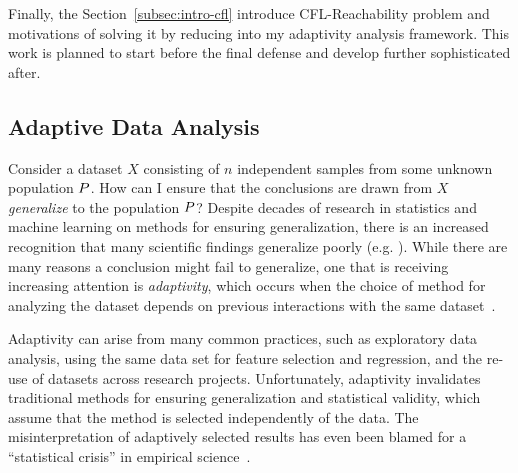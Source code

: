 Finally, the Section~\ref*{subsec:intro-cfl} introduce 
CFL-Reachability problem and motivations of 
solving it by reducing into my adaptivity analysis framework. 
 This work is planned to start before the final defense and develop further sophisticated after.

\subsection{Adaptive Data Analysis}
\label{subsec:intro-motivation}


Consider a dataset $X$ consisting of $n$ independent samples from some unknown population $P$. How can I ensure that the conclusions are drawn from $X$ \emph{generalize} to the population $P$? Despite decades of research in statistics and machine learning on methods for ensuring generalization, there is an increased recognition that many scientific findings generalize poorly (e.g. 
\cite{Ioannidis05,GelmanL13}
). While there are many reasons a conclusion might fail to generalize, one that is receiving increasing attention is \emph{adaptivity}, which occurs when the choice of method for analyzing the dataset depends on previous interactions with the same dataset~\cite{GelmanL13}.

 Adaptivity can arise from many common practices, such as exploratory data analysis, using the same data set for feature selection and regression, and the re-use of datasets across research projects. Unfortunately, adaptivity invalidates traditional methods for ensuring generalization and statistical validity, which assume that the method is selected independently of the data. The misinterpretation of adaptively selected results has even been blamed for a ``statistical crisis'' in empirical science~\cite{GelmanL13}.

